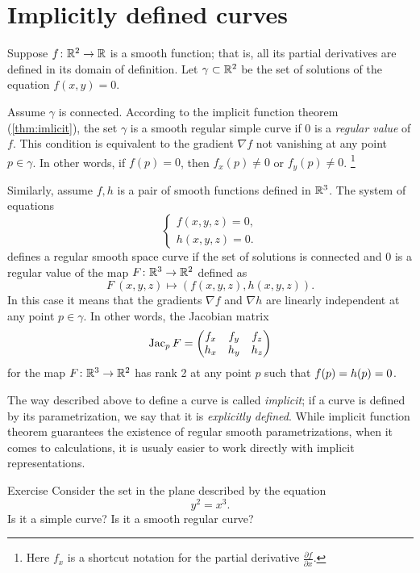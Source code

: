 \section{Implicitly defined curves}

Suppose $f\colon\mathbb{R}^2\to \mathbb{R}$ is a smooth function; 
that is, all its partial derivatives are defined in its domain of definition.
Let $\gamma\subset \mathbb{R}^2$ be the set of solutions of the equation $f(x,y)=0$.

Assume $\gamma$ is connected.
According to the implicit function theorem (\ref{thm:imlicit}), the set $\gamma$ is a smooth regular simple curve if $0$ is a \emph{regular value} of $f$.
This condition is equivalent to the gradient $\nabla f$ not vanishing at any point $p\in \gamma$.
In other words, if $f(p)=0$, then   
$f_x(p)\ne 0$ or $f_y(p)\ne 0$.%
\footnote{Here $f_x$ is a shortcut notation for the partial derivative
$\tfrac{\partial f}{\partial x}$.}

Similarly, assume $f,h$ is a pair of smooth functions defined in $\mathbb{R}^3$.
The system of equations
\[\begin{cases}
   f(x,y,z)=0,
   \\
   h(x,y,z)=0.
  \end{cases}
\]
defines a regular smooth space curve if the set of solutions is connected and $0$ is a regular value of the map $F\colon\mathbb{R}^3\to\mathbb{R}^2$ defined as
\[F\:(x,y,z)\mapsto (f(x,y,z),h(x,y,z)).\]
In this case it means that the gradients $\nabla f$ and $\nabla h$ are linearly independent at any point $p\in \gamma$.
In other words, the Jacobian matrix
\[
\mathop{\rm Jac}\nolimits_pF=\begin{pmatrix}
f_x&f_y&f_z\\
h_x&h_y&h_z
\end{pmatrix}
\]
for the map $F\colon\mathbb{R}^3\to\mathbb{R}^2$ has rank 2 at any point $p$ such that $f(p)\z=h(p)\z=0$.

The way described above to define a curve is called \emph{implicit};
if a curve is defined by its parametrization, we say that it is \emph{explicitly defined}.
While implicit function theorem guarantees the existence of regular smooth parametrizations,
when it comes to calculations, it is usualy easier to work directly with implicit representations. 

\begin{thm}{Exercise}\label{ex:y^2=x^3}
Consider the set in the plane described by the equation
\[y^2=x^3.\]
Is it a simple curve?
Is it a smooth regular curve?
\end{thm}

